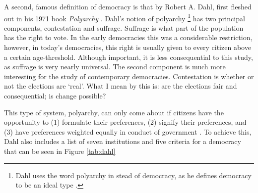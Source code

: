 A second, famous definition of democracy is that by Robert A. Dahl, first fleshed out in his 1971 book \textit{Polyarchy} \citeyearpar{dahl_polyarchy_1971}. Dahl's notion of polyarchy \footnote{Dahl uses the word polyarchy in stead of democracy, as he defines democracy to be an ideal type \citep[p.9]{dahl_polyarchy_1971}.} has two principal components, contestation and suffrage. Suffrage is what part of the population has the right to vote. In the early democracies this was a considerable restriction, however, in today's democracies, this right is usually given to every citizen above a certain age-threshold. Although important, it is less consequential to this study, as suffrage is very nearly universal. The second component is much more interesting for the study of contemporary democracies. Contestation is whether or not the elections are `real'. What I mean by this is: are the elections fair and consequential; is change possible? 

This type of system, polyarchy, can only come about if citizens have the opportunity to (1) formulate their preferences, (2) signify their preferences, and (3) have preferences weighted equally in conduct of government \citep[pp.2-3]{dahl_polyarchy_1971}. To achieve this, Dahl also includes a list of seven institutions and five criteria for a democracy that can be seen in Figure \ref{tab:dahl} 

